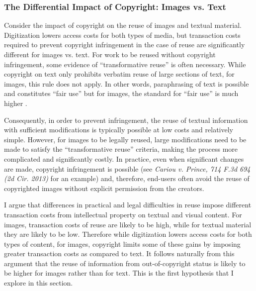 \documentclass[11pt]{article}
\begin{document}

\subsubsection{The Differential Impact of Copyright: Images vs. Text}


Consider the impact of copyright on the reuse of images and textual material. Digitization lowers access costs for both types of media, but transaction costs required to prevent copyright infringement in the case of reuse are significantly different for images vs. text. For work to be reused without copyright infringement, some evidence of ``transformative reuse'' is often necessary. While copyright on text only prohibits verbatim reuse of large sections of text, for images, this rule does not apply. In other words, paraphrasing of text is possible and constitutes ``fair use'' but for images, the standard for ``fair use'' is much higher \citep{leval_toward_1990}. 

Consequently, in order to prevent infringement, the reuse of textual information with sufficient modifications is typically possible at low costs and relatively simple. However, for images to be legally reused, large modifications need to be made to satisfy the ``transformative reuse'' criteria, making the process more complicated and significantly costly. In practice, even when significant changes are made, copyright infringement is possible (see \emph{Cariou v. Prince, 714 F.3d 694 (2d Cir. 2013)} for an example) and, therefore, end-users often avoid the reuse of copyrighted images without explicit permission from the creators.

I argue that differences in practical and legal difficulties in reuse impose different transaction costs from intellectual property on textual and visual content. For images, transaction costs of reuse are likely to be high, while for textual material they are likely to be low. Therefore while digitization lowers access costs for both types of content, for images, copyright limits some of these gains by imposing greater transaction costs as compared to text. It follows naturally from this argument that the reuse of information from out-of-copyright status is likely to be higher for images rather than for text. This is the first hypothesis that I explore in this section. 
\end{document}
